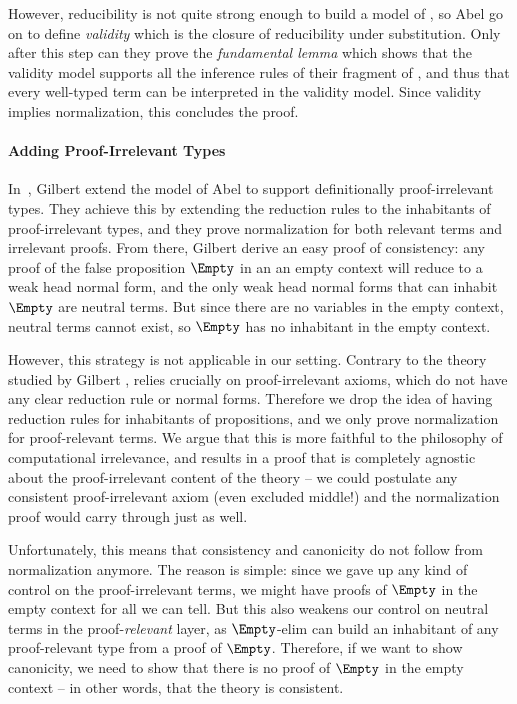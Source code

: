 However, reducibility is not quite strong enough to build a model of \MLTT, 
so Abel \etal go on to define \emph{validity} which is the closure 
of reducibility under substitution.
% 
Only after this step can they prove the \emph{fundamental lemma} which shows 
that the validity model supports all the inference rules of their fragment of
\MLTT, and thus that every well-typed term can be interpreted in the validity
model. Since validity implies normalization, this concludes the proof.

\paragraph*{Adding Proof-Irrelevant Types}
% 
In~, Gilbert \etal extend the model of 
Abel \etal to support definitionally proof-irrelevant types.
% 
They achieve this by extending the reduction rules to the inhabitants of 
proof-irrelevant types, and they prove normalization for both relevant
terms and irrelevant proofs.
%
From there, Gilbert \etal derive an easy proof of consistency: any proof of 
the false proposition \( \Empty \) in an an empty context will reduce to a
weak head normal form, and the only weak head normal forms that can inhabit 
\( \Empty \) are neutral terms. 
% 
But since there are no variables in the empty context, neutral terms cannot 
exist, so \( \Empty \) has no inhabitant in the empty context.

However, this strategy is not applicable in our setting. Contrary to the theory
studied by Gilbert \etal, \SetoidCC relies crucially on proof-irrelevant 
axioms, which do not have any clear reduction rule or normal forms.
%
Therefore we drop the idea of having reduction rules for inhabitants of 
propositions, and we only prove normalization for proof-relevant terms.
%
We argue that this is more faithful to the philosophy of computational
irrelevance, and results in a proof that is completely agnostic about
the proof-irrelevant content of the theory -- we could postulate any
consistent proof-irrelevant axiom (even excluded middle!) and the normalization 
proof would carry through just as well.

Unfortunately, this means that consistency and canonicity do not follow
from normalization anymore. The reason is simple: since we gave up any
kind of control on the proof-irrelevant terms, we might have proofs
of \( \Empty \) in the empty context for all we can tell.
% 
But this also weakens our control on neutral terms in the proof-\emph{relevant} 
layer, as \( \Empty \)-elim can build an inhabitant of any proof-relevant type 
from a proof of \( \Empty \).
% 
Therefore, if we want to show canonicity, we need to show that there is no proof 
of \( \Empty \) in the empty context -- in other words, that the theory is 
consistent.


